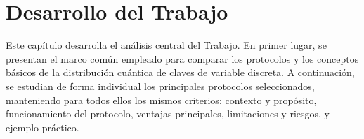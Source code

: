 \chapter{Desarrollo del Trabajo}

Este capítulo desarrolla el análisis central del Trabajo. En primer lugar, se presentan el marco común empleado para comparar los protocolos y  los conceptos básicos de la distribución cuántica de claves de variable discreta. A continuación, se estudian de forma individual los principales protocolos seleccionados, manteniendo para todos ellos los mismos criterios: contexto y propósito, funcionamiento del protocolo, ventajas principales, limitaciones y riesgos, y ejemplo práctico.











